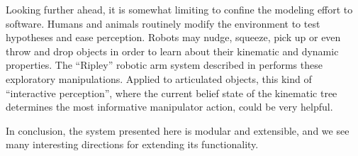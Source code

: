 \documentclass[letterpaper, 10 pt, conference]{ieeeconf}  %
\begin{document}
Looking further ahead, it is somewhat limiting to confine the modeling effort to software. Humans and animals routinely modify the environment to test hypotheses and ease perception. Robots may nudge, squeeze, pick up or even throw and drop objects in order to learn about their kinematic and dynamic properties. The ``Ripley'' robotic arm system described in \cite{Hsiao2005} performs these exploratory manipulations. Applied to articulated objects, this kind of ``interactive perception'', where the current belief state of the kinematic tree determines the most informative manipulator action, could be very helpful.

In conclusion, the system presented here is modular and extensible, and we see many interesting directions for extending its functionality.


\appendix
\end{document}
